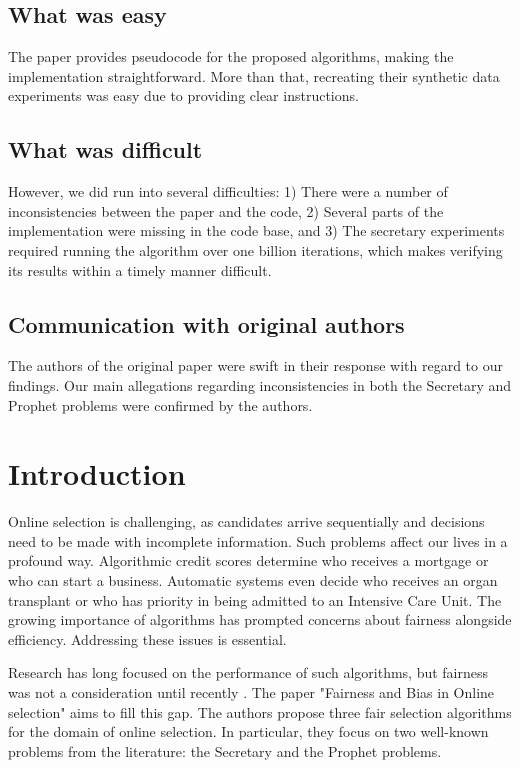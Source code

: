 \subsection*{What was easy}

The paper provides pseudocode for the proposed algorithms, making the implementation straightforward. More than that, recreating their synthetic data experiments was easy due to providing clear instructions.

\subsection*{What was difficult}
However, we did run into several difficulties: 1) There were a number of inconsistencies between the paper and the code, 2) Several parts of the implementation were missing in the code base, and 3) The secretary experiments required running the algorithm over one billion iterations, which makes verifying its results within a timely manner difficult.

\subsection*{Communication with original authors}
The authors of the original paper were swift in their response with regard to our findings. Our main allegations regarding inconsistencies in both the Secretary and Prophet problems were confirmed by the authors.

\section{Introduction}

Online selection is challenging, as candidates arrive sequentially and decisions need to be made with incomplete information. Such problems affect our lives in a profound way. Algorithmic credit scores determine who receives a mortgage or who can start a business. Automatic systems even decide who receives an organ transplant or who has priority in being admitted to an Intensive Care Unit. The growing importance of algorithms has prompted concerns about fairness alongside efficiency. Addressing these issues is essential.

 Research has long focused on the performance of such algorithms, but fairness was not a consideration until recently \cite{buchbinder2014secretary,Cayci2020}. The paper "Fairness and Bias in Online selection" \cite{correa21} aims to fill this gap. The authors propose three fair selection algorithms for the  domain of online selection. In particular, they focus on two well-known problems from the literature: the Secretary and the Prophet problems.


